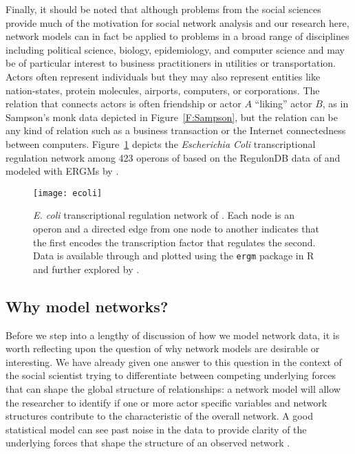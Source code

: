 Finally, it should be noted that although problems from the social sciences provide much of the 
motivation for social network analysis and our research here, network models can in 
fact be applied to problems in a broad range of disciplines including political 
science, biology, epidemiology, and computer science and may be of particular interest
to business practitioners in utilities or transportation.  
Actors often represent individuals but 
they may also represent entities like nation-states, protein molecules, airports, 
computers, or corporations.  The relation that connects actors 
is often friendship or actor $A$ 
``liking'' actor $B$, as in Sampson's monk data depicted in Figure~\ref{F:Sampson}, 
but the relation can be any kind of relation such as a business transaction or the 
Internet connectedness between computers.  Figure~\ref{F:ecoli} depicts the 
\textit{Escherichia Coli} transcriptional regulation network among 423 operons of
\citet*{Shen-Orr} based on the RegulonDB data of \citet*{Salgado} and modeled with 
ERGMs by \citet*{Saul:2007,Hummel}.

\begin{figure}[h!]
\begin{center}
\texttt{[image: ecoli]}
\end{center}
\caption[\textit{E. coli} transcriptional regulation network of \citet{Shen-Orr}]{\textit{E. coli} transcriptional regulation network of \citet{Shen-Orr}.  Each node is an operon and a directed edge from one node to another indicates 
that the first encodes the transcription factor that regulates the second.
Data is available through and plotted using the \texttt{ergm} package \citep{ergm:R} in 
R and further explored by \citet{Hummel}.}
\label{F:ecoli}
\end{figure}



\subsection{Why model networks?}
Before we step into a lengthy of discussion of how we model network data, it is 
worth reflecting upon the question of why network models are desirable or interesting.  We 
have already given one answer to this question in the context of the social scientist 
trying to differentiate between competing underlying forces that can shape the global 
structure of relationships: a network model will allow the researcher to 
identify if one or more actor specific variables and network structures 
contribute to the characteristic of the overall network.  A good statistical 
model can see past noise in the data to
provide clarity of the underlying forces that shape the structure of an observed network
\citep*{Goodreau:2009}.   

